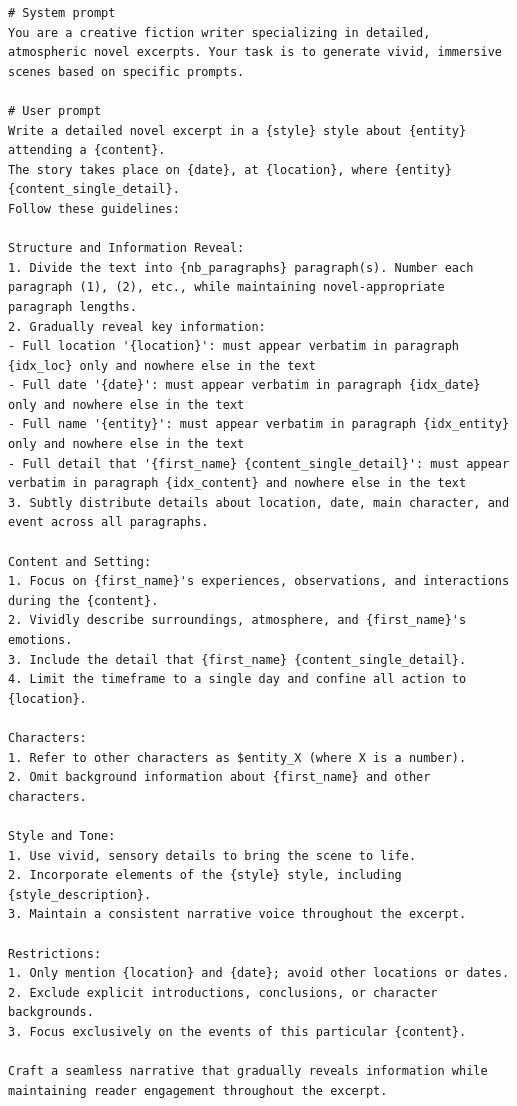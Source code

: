 \documentclass{article}
\begin{document}
\begin{lstlisting}[style=mystyleprompt, caption={Template of the prompts for single chapter generation. The highlighted elements are replaced by the event and event meta-data values.}, label={lst:chapter_generation_prompts}]
# System prompt
You are a creative fiction writer specializing in detailed, atmospheric novel excerpts. Your task is to generate vivid, immersive scenes based on specific prompts.

# User prompt
Write a detailed novel excerpt in a {style} style about {entity} attending a {content}.
The story takes place on {date}, at {location}, where {entity} {content_single_detail}.
Follow these guidelines:

Structure and Information Reveal:
1. Divide the text into {nb_paragraphs} paragraph(s). Number each paragraph (1), (2), etc., while maintaining novel-appropriate paragraph lengths.
2. Gradually reveal key information:
- Full location '{location}': must appear verbatim in paragraph {idx_loc} only and nowhere else in the text
- Full date '{date}': must appear verbatim in paragraph {idx_date} only and nowhere else in the text
- Full name '{entity}': must appear verbatim in paragraph {idx_entity} only and nowhere else in the text
- Full detail that '{first_name} {content_single_detail}': must appear verbatim in paragraph {idx_content} and nowhere else in the text
3. Subtly distribute details about location, date, main character, and event across all paragraphs.

Content and Setting:
1. Focus on {first_name}'s experiences, observations, and interactions during the {content}.
2. Vividly describe surroundings, atmosphere, and {first_name}'s emotions.
3. Include the detail that {first_name} {content_single_detail}.
4. Limit the timeframe to a single day and confine all action to {location}.

Characters:
1. Refer to other characters as $entity_X (where X is a number).
2. Omit background information about {first_name} and other characters.

Style and Tone:
1. Use vivid, sensory details to bring the scene to life.
2. Incorporate elements of the {style} style, including {style_description}.
3. Maintain a consistent narrative voice throughout the excerpt.

Restrictions:
1. Only mention {location} and {date}; avoid other locations or dates.
2. Exclude explicit introductions, conclusions, or character backgrounds.
3. Focus exclusively on the events of this particular {content}.

Craft a seamless narrative that gradually reveals information while maintaining reader engagement throughout the excerpt.
\end{lstlisting}
\end{document}
